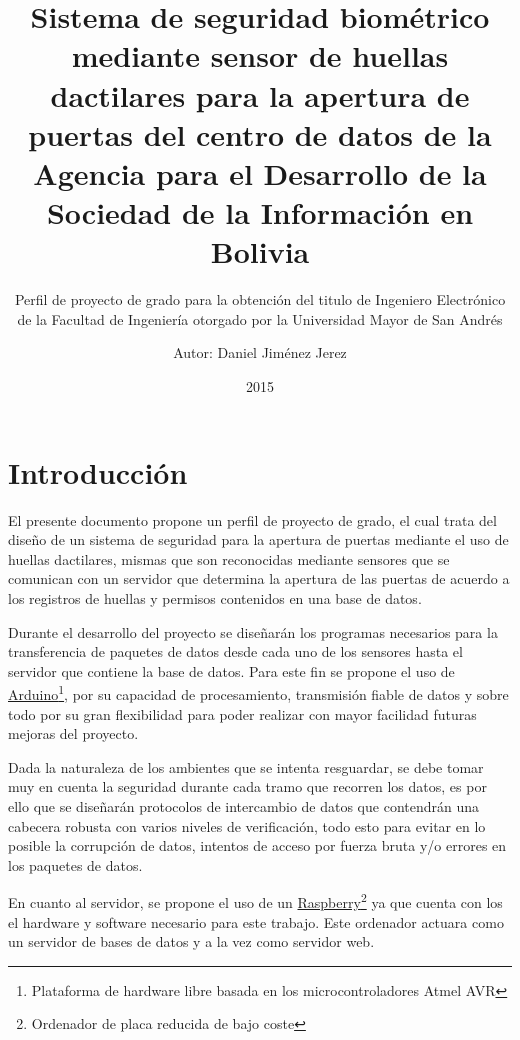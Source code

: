 \documentclass[12pt, letterpaper]{scrartcl}
\begin{document}
	\title{Sistema de seguridad biométrico mediante sensor de huellas dactilares para la apertura de puertas del centro de datos de la Agencia para el Desarrollo de la Sociedad de la Información en Bolivia\vspace{2em}}
	\subtitle{Perfil de proyecto de grado para la obtención del titulo de Ingeniero Electrónico de la Facultad de Ingeniería otorgado por la Universidad Mayor de San Andrés\vspace{4em}}
	\author{Autor: Daniel Jiménez Jerez\vspace{6em}}
	\date{2015}
	\maketitle
	\thispagestyle{empty}
	\newpage
	\setcounter{page}{1}
	\tableofcontents
	\newpage
	\setcounter{page}{1}
	\section{Introducción}
	El presente documento propone un perfil de proyecto de grado, el cual trata del diseño de un sistema de seguridad para la apertura de puertas mediante el uso de huellas dactilares, mismas que son reconocidas mediante sensores que se comunican con un servidor que determina la apertura de las puertas de acuerdo a los registros de huellas y permisos contenidos en una base de datos.
	
	Durante el desarrollo del proyecto se diseñarán los programas necesarios para la transferencia de paquetes de datos desde cada uno de los sensores hasta el servidor que contiene la base de datos. Para este fin se propone el uso de \href{http://www.arduino.cc/}{Arduino}\footnote{Plataforma de hardware libre basada en los microcontroladores Atmel AVR}, por su capacidad de procesamiento, transmisión fiable de datos y sobre todo por su gran flexibilidad para poder realizar con mayor facilidad futuras mejoras del proyecto.
	
	Dada la naturaleza de los ambientes que se intenta resguardar, se debe tomar muy en cuenta la seguridad durante cada tramo que recorren los datos, es por ello que se diseñarán protocolos de intercambio de datos que contendrán una cabecera robusta con varios niveles de verificación, todo esto para evitar en lo posible la corrupción de datos, intentos de acceso por fuerza bruta y/o errores en los paquetes de datos.
	
	En cuanto al servidor, se propone el uso de un  \href{http://www.raspberrypi.org/}{Raspberry}\footnote{Ordenador de placa reducida de bajo coste} ya que cuenta con los el hardware y software necesario para este trabajo. Este ordenador actuara como un servidor de bases de datos y a la vez como servidor web.
	
\end{document}
